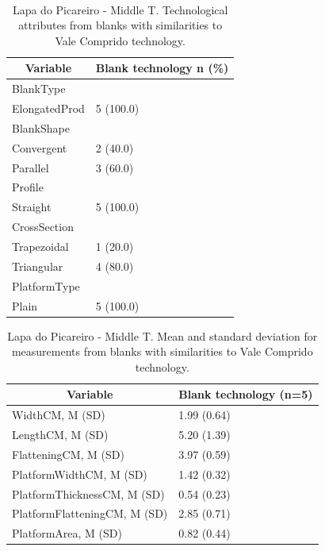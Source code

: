 \documentclass[12pt,twoside]{reedthesis}
\begin{document}
~
\begin{table}[!h]

\caption{\label{tab:VClpAT}Lapa do Picareiro - Middle T. Technological attributes from blanks with similarities to Vale Comprido technology.}
\centering
\fontsize{9}{11}\selectfont
\begin{tabular}[t]{ll}
\toprule
\multicolumn{1}{c}{\textbf{Variable}} & \multicolumn{1}{c}{\textbf{Blank technology n (\%)}}\\
\midrule
BlankType & \\
ElongatedProd & 5 (100.0)\\
BlankShape & \\
Convergent & 2 (40.0)\\
Parallel & 3 (60.0)\\
\addlinespace
Profile & \\
Straight & 5 (100.0)\\
CrossSection & \\
Trapezoidal & 1 (20.0)\\
Triangular & 4 (80.0)\\
\addlinespace
PlatformType & \\
Plain & 5 (100.0)\\
\bottomrule
\end{tabular}
\end{table}
\begin{table}[!h]

\caption{\label{tab:VClpmean}Lapa do Picareiro - Middle T. Mean and standard deviation for measurements from blanks with similarities to Vale Comprido technology.}
\centering
\fontsize{9}{11}\selectfont
\begin{tabular}[t]{ll}
\toprule
\multicolumn{1}{c}{\textbf{Variable}} & \multicolumn{1}{c}{\textbf{Blank technology (n=5)}}\\
\midrule
WidthCM, M (SD) & 1.99 (0.64)\\
LengthCM, M (SD) & 5.20 (1.39)\\
FlatteningCM, M (SD) & 3.97 (0.59)\\
PlatformWidthCM, M (SD) & 1.42 (0.32)\\
PlatformThicknessCM, M (SD) & 0.54 (0.23)\\
\addlinespace
PlatformFlatteningCM, M (SD) & 2.85 (0.71)\\
PlatformArea, M (SD) & 0.82 (0.44)\\
\bottomrule
\end{tabular}
\end{table}
\end{document}
